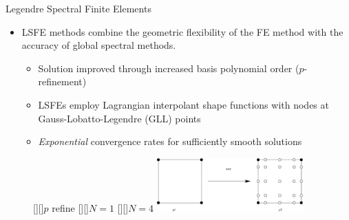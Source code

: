 \documentclass[xcolor=cmyk]{beamer}
\begin{document}
\begin{frame}{Legendre Spectral Finite Elements}
\normalsize

\begin{itemize}
\item
LSFE methods combine the geometric flexibility of
the FE method with the accuracy of global spectral methods.
%
\begin{itemize}
%
   \item Solution improved through increased basis polynomial order
($p$-refinement)
%
    \item LSFEs employ Lagrangian interpolant shape functions with nodes at
Gauss-Lobatto-Legendre (GLL) points 
%
  \item \textit{Exponential} convergence rates for sufficiently
smooth solutions

\end{itemize}
%

\end{itemize}

\begin{figure}[h!tp]
   [][]{$p$ refine}
   [][]{$N=1$}
   [][]{$N=4$}
   \includegraphics[width=0.5\textwidth,clip]{figs/refine.eps}
\end{figure}


\end{frame}

\end{document}
